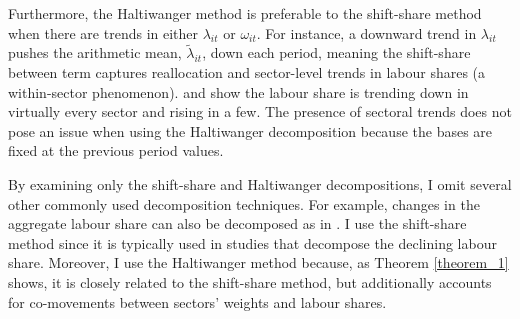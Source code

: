 Furthermore, the Haltiwanger method is preferable to the shift-share method when there are trends in either $\lambda_{it}$ or $\omega_{it}$. For instance, a downward trend in $\lambda_{it}$ pushes the arithmetic mean, $\tilde{\lambda}_{it}$, down each period, meaning the shift-share between term captures reallocation and sector-level trends in labour shares (a within-sector phenomenon). \citet{diez-catalanLaborShareService2018, elsbyDeclineLaborShare2013a} and \citet{gutierrezInvestigatingGlobalLabor2017} show the labour share is trending down in virtually every sector and rising in a few. The presence of sectoral trends does not pose an issue when using the Haltiwanger decomposition because the bases are fixed at the previous period values. 

By examining only the shift-share and Haltiwanger decompositions, I omit several other commonly used decomposition techniques. For example, changes in the aggregate labour share can also be decomposed as in  \citet{olleyDynamicsProductivityTelecommunications1996}. I use the shift-share method since it is typically used in studies that decompose the declining labour share. Moreover, I use the Haltiwanger method because, as Theorem \ref{theorem_1} shows, it is closely related to the shift-share method, but additionally accounts for co-movements between sectors' weights and labour shares.  





